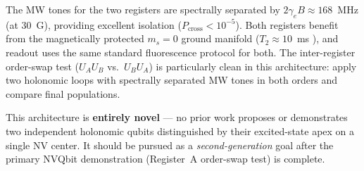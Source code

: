 \documentclass[11pt,letterpaper]{article}
\begin{document}
\medskip
\noindent The MW tones for the two registers are spectrally separated by $2\gamma_e B \approx 168$~MHz (at 30~G), providing excellent isolation ($P_\mathrm{cross} < 10^{-5}$). Both registers benefit from the magnetically protected $m_s = 0$ ground manifold ($T_2 \approx 10$~ms \cite{Pfender2017}), %
and readout uses the same standard fluorescence protocol for both. The inter-register order-swap test ($U_A U_B$ vs.\ $U_B U_A$) is particularly clean in this architecture: apply two holonomic loops with spectrally separated MW tones in both orders and compare final populations.

\medskip
\noindent This architecture is \textbf{entirely novel} --- no prior work proposes or demonstrates two independent holonomic qubits distinguished by their excited-state apex on a single NV center. It should be pursued as a \emph{second-generation} goal after the primary NVQbit demonstration (Register~A order-swap test) is complete.

\end{document}
